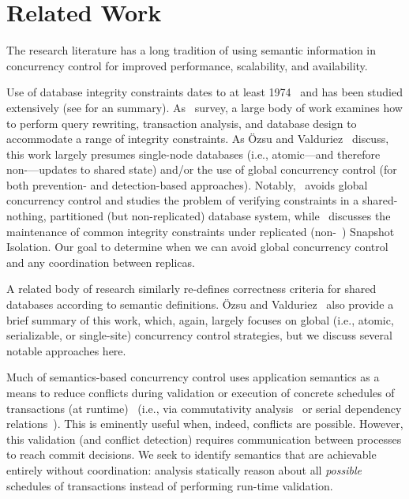 
\section{Related Work}
\label{sec:relatedwork}

The research literature has a long tradition of using semantic
information in concurrency control for improved performance,
scalability, and availability.


 Use of database integrity constraints
dates to at least 1974~\cite{florentin-constraints} and has been
studied extensively (see \cite{tamer-book} for an
summary). As~\cite{ic-survey,ic-survey-two} survey, a large body of
work examines how to perform query rewriting, transaction analysis,
and database design to accommodate a range of integrity
constraints. As \"{O}zsu and Valduriez~\cite{tamer-book} discuss, this
work largely presumes single-node databases (i.e., atomic---and
therefore non-\cfree---updates to shared state) and/or the use of
global concurrency control (for both prevention- and detection-based
approaches). Notably,~\cite{local-verification} avoids global
concurrency control and studies the problem of verifying constraints
in a shared-nothing, partitioned (but non-replicated) database system,
while~\cite{kemme-si-ic} discusses the maintenance of common integrity
constraints under replicated (non-\cfree~\cite{hat-vldb}) Snapshot
Isolation. Our goal to determine when we can avoid global concurrency
control and any coordination between replicas.


 A related body of
research similarly re-defines correctness criteria for shared
databases according to semantic definitions. \"{O}zsu and
Valduriez~\cite{tamer-book} also provide a brief summary of this work,
which, again, largely focuses on global (i.e., atomic, serializable,
or single-site) concurrency control strategies, but we discuss several
notable approaches here.

Much of semantics-based concurrency control uses application semantics
as a means to reduce conflicts during validation or execution of
concrete schedules of transactions (at
runtime)~\cite{badrinath-semantics} (i.e., via commutativity
analysis~\cite{weihl-thesis} or serial dependency
relations~\cite{herlihy-apologizing}). This is eminently useful when,
indeed, conflicts are possible. However, this validation (and conflict
detection) requires communication between processes to reach commit
decisions. We seek to identify semantics that are achievable entirely
without coordination: \iconfluence analysis statically reason about
all \textit{possible} schedules of transactions instead of performing
run-time validation.

